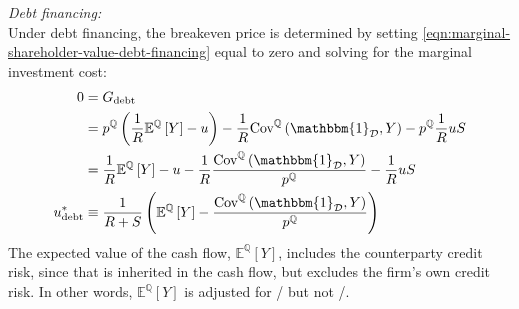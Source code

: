 \documentclass[../main.tex]{subfiles}
\begin{document}
            \textit{Debt financing:} \\
            Under debt financing, the breakeven price is determined by setting
            \cref{eqn:marginal-shareholder-value-debt-financing} equal to zero
            and solving for the marginal investment cost:
                \begin{align}
                    0 &= G_{\text{debt}} 
                        \nonumber\\
                    &=
                        p^{\mathbb{Q}} \left(
                            \discountfactor
                            \mathbb{E}^{\mathbb{Q}}\left[Y\right]
                            - u
                        \right)
                        -
                        \discountfactor
                        \text{Cov}^{\mathbb{Q}}\left(\mathbbm{1}_{\mathcal{D}}, Y\right) 
                        - 
                        p^{\mathbb{Q}} \discountfactor u S 
                        \nonumber\\
                    &= 
                        \discountfactor
                        \mathbb{E}^{\mathbb{Q}}\left[Y\right]  
                        - u
                        - 
                        \discountfactor
                        \frac{
                            \text{Cov}^{\mathbb{Q}}\left(\mathbbm{1}_{\mathcal{D}}, Y\right) 
                        }{
                            p^{\mathbb{Q}}
                        }
                        - \discountfactor u S 
                        \nonumber\\
                    u^{\ast}_{\text{debt}}
                    &\equiv
                        \frac{
                            1
                        }{
                            \grossrfrate + S
                        } 
                        \left(
                            \mathbb{E}^{\mathbb{Q}}\left[Y\right]
                            - \frac{
                                \text{Cov}^{\mathbb{Q}}\left(\mathbbm{1}_{\mathcal{D}}, Y\right)
                            }{
                                p^{\mathbb{Q}}  
                            } 
                        \right)
                    \label{eqn:shareholders-breakeven-debt-financing}
                \end{align}
            The expected value of the cash flow, $\mathbb{E}^{\mathbb{Q}}\left[Y\right]$,
            includes the counterparty credit risk, since that is inherited in the cash flow, 
            but excludes the firm's own credit risk. 
            In other words, $\mathbb{E}^{\mathbb{Q}}\left[Y\right]$ is adjusted for \CVA/ but not \DVA/.
\end{document}
